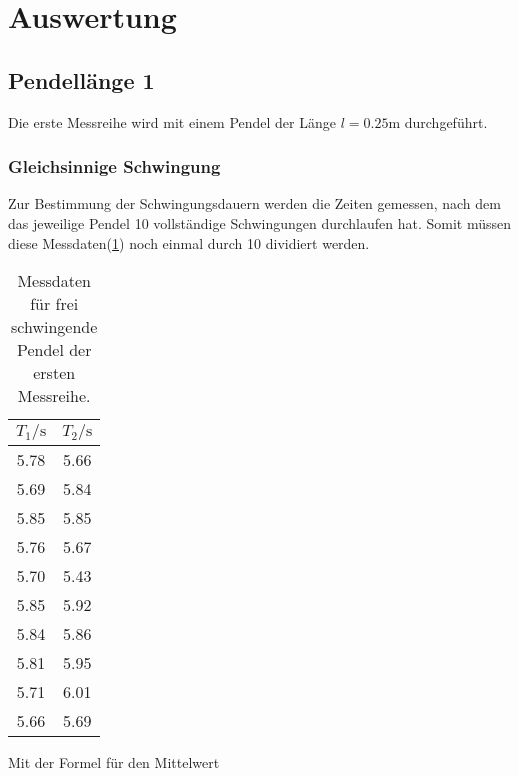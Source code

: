 \newpage
\section{Auswertung}

    \subsection{Pendellänge 1}

        \noindent Die erste Messreihe wird mit einem Pendel der Länge $l = 0.25 \si{\m}$ durchgeführt.

        \subsubsection{Gleichsinnige Schwingung}

            \noindent Zur Bestimmung der Schwingungsdauern werden die Zeiten gemessen, nach dem das jeweilige Pendel 10 vollständige Schwingungen 
            durchlaufen hat. Somit müssen diese Messdaten(\ref{tab:frei1}) noch einmal durch 10 dividiert werden.

            \begin{table}[ht]
                \centering
                \caption{Messdaten für frei schwingende Pendel der ersten Messreihe.}
                \label{tab:frei1}
                \begin{tabular}{c c}
                 \toprule
                 $T_1 / \si{\s}$ & $T_2 / \si{\s}$\\
                 \midrule
                 5.78  &  5.66 \\
                 5.69  &  5.84 \\
                 5.85  &  5.85 \\
                 5.76  &  5.67 \\
                 5.70  &  5.43 \\
                 5.85  &  5.92 \\
                 5.84  &  5.86 \\
                 5.81  &  5.95 \\
                 5.71  &  6.01 \\
                 5.66  &  5.69 \\
                 \bottomrule
                \end{tabular}
            \end{table}

            \noindent Mit der Formel für den Mittelwert 

